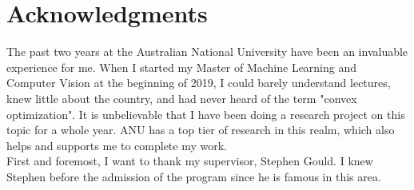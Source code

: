\chapter*{Acknowledgments}
The past two years at the Australian National University have been an invaluable experience for me. When I started my Master of Machine Learning and Computer Vision at the beginning of 2019, I could barely understand lectures, knew little about the country, and had never heard of the term "convex optimization". It is unbelievable that I have been doing a research project on this topic for a whole year. ANU has a top tier of research in this realm, which also helps and supports me to complete my work. \\
First and foremost, I want to thank my supervisor, Stephen Gould. I knew Stephen before the admission of the program since he is famous in this area. 
